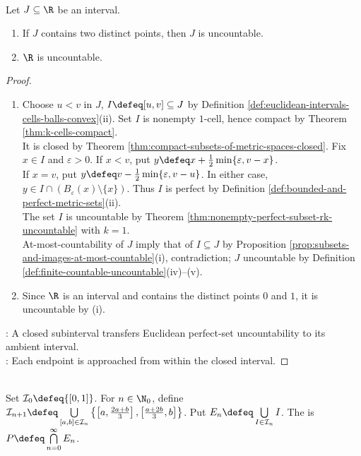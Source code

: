 \begin{corollary} \label{cor:closed-intervals-and-reals-uncountable} \\
Let $J\subseteq\R$ be an interval.
\begin{enumerate}[label=(\roman*)]
\setlength{\itemsep}{0pt}
\item If $J$ contains two distinct points, then $J$ is uncountable.
\item $\R$ is uncountable.
\end{enumerate}
\begin{proof}
\begin{enumerate}[label=(\roman*)]
\setlength{\itemsep}{0pt}
\item Choose $u<v$ in $J$, $I\defeq[u,v]\subseteq J$ by Definition \ref{def:euclidean-intervals-cells-balls-convex}(ii). Set $I$ is nonempty $1$-cell, hence compact by Theorem \ref{thm:k-cells-compact}.\\
It is closed by Theorem \ref{thm:compact-subsets-of-metric-spaces-closed}. Fix $x\in I$ and $\varepsilon>0$. If $x<v$, put $y\defeq x+\frac12\min\{\varepsilon,v-x\}$.\\
If $x=v$, put $y\defeq v-\frac12\min\{\varepsilon,v-u\}$. In either case, $y\in I\cap(B_\varepsilon(x)\setminus\{x\})$. Thus $I$ is perfect by Definition \ref{def:bounded-and-perfect-metric-sets}(ii).\\
The set $I$ is uncountable by Theorem \ref{thm:nonempty-perfect-subset-rk-uncountable} with $k=1$.\\
At-most-countability of $J$ imply that of $I\subseteq J$ by Proposition \ref{prop:subsets-and-images-at-most-countable}(i), contradiction; $J$ uncountable by Definition \ref{def:finite-countable-uncountable}(iv)--(v).
\item Since $\R$ is an interval and contains the distinct points $0$ and $1$, it is uncountable by (i).
\end{enumerate}
: A closed subinterval transfers Euclidean perfect-set uncountability to its ambient interval.\\
: Each endpoint is approached from within the closed interval.
\end{proof}
\end{corollary}

\begin{definition} \label{def:cantor-set} \\
Set $\mathcal{I}_0\defeq\{[0,1]\}$. For $n\in\N_0$, define $\mathcal{I}_{n+1}\defeq\bigcup\limits_{[a,b]\in\mathcal{I}_n}\left\{\left[a,\frac{2a+b}{3}\right],\left[\frac{a+2b}{3},b\right]\right\}$. Put $E_n\defeq\bigcup\limits_{I\in\mathcal{I}_n}I$. The  is $P\defeq\bigcap\limits_{n=0}^{\infty}E_n$.
\end{definition}

